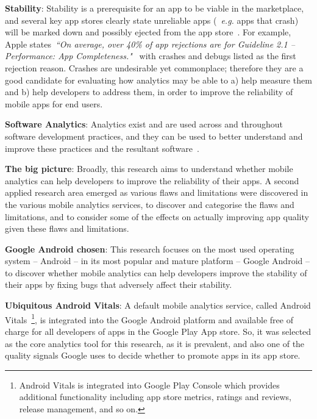 \textbf{Stability}: Stability is a prerequisite for an app to be viable in the marketplace, and several key app stores clearly state unreliable apps (~\emph{e.g.} apps that crash) will be marked down and possibly ejected from the app store~\citep{appleappstore2021_app_completeness, google_play_policy_center_broken_functionality, huaweidevelopers_appgallery_review_guidelines}. For example, Apple states~\emph{``On average, over 40\% of app rejections are for Guideline 2.1 – Performance: App Completeness."}~\citep{appleappstore2021_review_avoiding_common_app_rejections} with crashes and debugs listed as the first rejection reason. %
Crashes are undesirable yet commonplace; therefore they are a good candidate for evaluating how analytics may be able to a) help measure them and b) help developers to address them, in order to improve the reliability of mobile apps for end users.


\textbf{Software Analytics}: Analytics exist and are used across and throughout software development practices, and they can be used to better understand and improve these practices and the resultant software~\citep{buse_analytics_2010, buse2012_information_needs_for_software_development_analytics, menzies2018_unreasonable_effectiveness_of_software_analytics}.

\textbf{The big picture}: Broadly, this research aims to understand whether mobile analytics can help developers to improve the reliability of their apps. A second applied research area emerged as various flaws and limitations were discovered in the various mobile analytics services, to discover and categorise the flaws and limitations, and to consider some of the effects on actually improving app quality given these flaws and limitations.

\textbf{Google Android chosen}: This research focuses on the most used operating system -- Android -- in its most popular and mature platform -- Google Android -- to discover whether mobile analytics can help developers improve the stability of their apps by fixing bugs that adversely affect their stability. 

\textbf{Ubiquitous Android Vitals}: A default mobile analytics service, called Android Vitals~\footnote{Android Vitals is integrated into Google Play Console which provides additional functionality including app store metrics, ratings and reviews, release management, and so on.}, is integrated into the Google Android platform and available free of charge for all developers of apps in the Google Play App store. So, it was selected as the core analytics tool for this research, as it is prevalent, and also one of the quality signals Google uses to decide whether to promote apps in its app store. %

